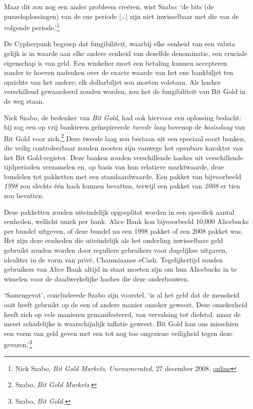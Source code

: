 \documentclass[
  a5paper,
  smalldemyvopaper,11pt,twoside,onecolumn,openright,extrafontsizes,
hidelinks]{memoir}
\begin{document}
Maar dit zou nog een ander probleem creëren, wist Szabo: `de bits (de
puzzeloplossingen) van de ene periode {[}\ldots{]} zijn niet
inwisselbaar met die van de volgende periode.'\footnote{Nick Szabo,
  \emph{Bit Gold Markets}, \emph{Unenumerated}, 27 december 2008,
  \href{https://unenumerated.blogspot.com/2008/04/bit-gold-markets.html}{online}}

De Cypherpunk begreep dat fungibiliteit, waarbij elke eenheid van een
valuta gelijk is in waarde aan elke andere eenheid van dezelfde
denominatie, een cruciale eigenschap is van geld. Een winkelier moet een
betaling kunnen accepteren zonder te hoeven nadenken over de exacte
waarde van het ene bankbiljet ten opzichte van het andere; elk
dollarbiljet zou moeten volstaan. Als hashes verschillend gewaardeerd
zouden worden, zou het de fungibiliteit van Bit Gold in de weg staan.

Nick Szabo, de bedenker van \emph{Bit Gold}, had ook hiervoor een
oplossing bedacht: hij zag een op vrij bankieren geïnspireerde
\emph{tweede laag} bovenop de \emph{basisslaag} van Bit Gold voor
zich.\footnote{Szabo, \emph{Bit Gold Markets.}} Deze tweede laag zou
bestaan uit een speciaal soort banken, die veilig controleerbaar zouden
moeten zijn vanwege het openbare karakter van het Bit Gold-register.
Deze banken zouden verschillende hashes uit verschillende tijdperioden
verzamelen en, op basis van hun relatieve marktwaarde, deze bundelen tot
pakketten met een standaardwaarde. Een pakket van bijvoorbeeld
\emph{1998} zou slechts één hash kunnen bevatten, terwijl een pakket van
\emph{2008} er tien zou bevatten.

Deze pakketten zouden uiteindelijk opgesplitst worden in een specifiek
aantal eenheden, wellicht uniek per bank. Alice Bank kon bijvoorbeeld
10,000 Alicebucks per bundel uitgeven, of deze bundel nu een 1998 pakket
of een 2008 pakket was. Het zijn deze eenheden die uiteindelijk als het
onderling inwisselbare geld gebruikt zouden worden door reguliere
gebruikers voor dagelijkse uitgaven, idealiter in de vorm van privé,
Chaumiaanse eCash. Tegelijkertijd zouden gebruikers van Alice Bank
altijd in staat moeten zijn om hun Alicebucks in te wisselen voor de
daadwerkelijke hashes die deze onderbouwen.

`Samengevat', concludeerde Szabo zijn voorstel, `is al het geld dat de
mensheid ooit heeft gebruikt op de een of andere manier onzeker geweest.
Deze onzekerheid heeft zich op vele manieren gemanifesteerd, van
vervalsing tot diefstal, maar de meest schadelijke is waarschijnlijk
inflatie geweest. Bit Gold kan ons misschien een vorm van geld geven met
een tot nog toe ongeziene veiligheid tegen deze gevaren.'\footnote{Szabo,
  \emph{Bit Gold.}}
\end{document}
